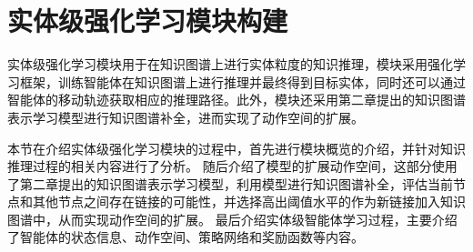 \documentclass[algorithmlist, AutoFakeBold, AutoFakeSlant, figurelist, tablelist, nomlist, masters]{seuthesix}
\begin{document}
\section{实体级强化学习模块构建}
实体级强化学习模块用于在知识图谱上进行实体粒度的知识推理，模块采用强化学习框架，训练智能体在知识图谱上进行推理并最终得到目标实体，同时还可以通过智能体的移动轨迹获取相应的推理路径。此外，模块还采用第二章提出的知识图谱表示学习模型进行知识图谱补全，进而实现了动作空间的扩展。

本节在介绍实体级强化学习模块的过程中，首先进行模块概览的介绍，并针对知识推理过程的相关内容进行了分析。
随后介绍了模型的扩展动作空间，这部分使用了第二章提出的知识图谱表示学习模型，利用模型进行知识图谱补全，评估当前节点和其他节点之间存在链接的可能性，并选择高出阈值水平的作为新链接加入知识图谱中，从而实现动作空间的扩展。
最后介绍实体级智能体学习过程，主要介绍了智能体的状态信息、动作空间、策略网络和奖励函数等内容。
\end{document}
